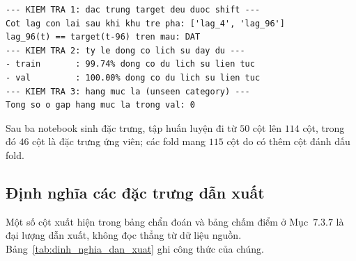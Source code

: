 \documentclass[12pt, a4paper]{report}
\begin{document}
\begingroup
\par{}\vspace{8pt}
\small\renewcommand{\baselinestretch}{1.0}\selectfont
\begin{verbatim}
--- KIEM TRA 1: dac trung target deu duoc shift ---
Cot lag con lai sau khi khu tre pha: ['lag_4', 'lag_96']
lag_96(t) == target(t-96) tren mau: DAT
--- KIEM TRA 2: ty le dong co lich su day du ---
- train       : 99.74% dong co du lich su lien tuc
- val         : 100.00% dong co du lich su lien tuc
--- KIEM TRA 3: hang muc la (unseen category) ---
Tong so o gap hang muc la trong val: 0
\end{verbatim}
\par\vspace{8pt}
\endgroup
Sau ba notebook sinh đặc trưng, tập huấn luyện đi từ $50$ cột lên $114$ cột, trong đó $46$
cột là đặc trưng ứng viên; các fold mang $115$ cột do có thêm cột đánh dấu fold.

\FloatBarrier
\subsection{Định nghĩa các đặc trưng dẫn xuất}

Một số cột xuất hiện trong bảng chẩn đoán và bảng chấm điểm ở Mục~$7.3.7$ là đại lượng dẫn xuất,
không đọc thẳng từ dữ liệu nguồn. Bảng~\ref{tab:dinh_nghia_dan_xuat} ghi công thức của chúng.
\end{document}

